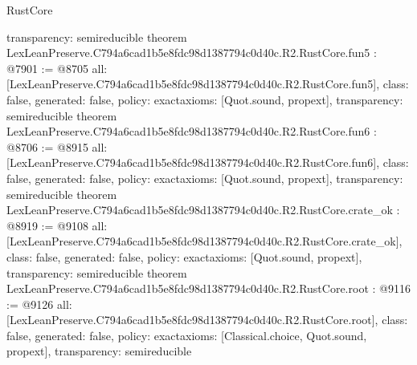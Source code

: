 \begin{lexlean}{RustCore}
\begin{coremodule}
{  transparency: semireducible
}
theorem LexLeanPreserve.C794a6cad1b5e8fdc98d1387794c0d40c.R2.RustCore.fun5 : @7901 := @8705 {
  all: [LexLeanPreserve.C794a6cad1b5e8fdc98d1387794c0d40c.R2.RustCore.fun5],
  class: false,
  generated: false,
  policy: exact{axioms: [Quot.sound, propext]},
  transparency: semireducible
}
theorem LexLeanPreserve.C794a6cad1b5e8fdc98d1387794c0d40c.R2.RustCore.fun6 : @8706 := @8915 {
  all: [LexLeanPreserve.C794a6cad1b5e8fdc98d1387794c0d40c.R2.RustCore.fun6],
  class: false,
  generated: false,
  policy: exact{axioms: [Quot.sound, propext]},
  transparency: semireducible
}
theorem LexLeanPreserve.C794a6cad1b5e8fdc98d1387794c0d40c.R2.RustCore.crate_ok : @8919 := @9108 {
  all: [LexLeanPreserve.C794a6cad1b5e8fdc98d1387794c0d40c.R2.RustCore.crate_ok],
  class: false,
  generated: false,
  policy: exact{axioms: [Quot.sound, propext]},
  transparency: semireducible
}
theorem LexLeanPreserve.C794a6cad1b5e8fdc98d1387794c0d40c.R2.RustCore.root : @9116 := @9126 {
  all: [LexLeanPreserve.C794a6cad1b5e8fdc98d1387794c0d40c.R2.RustCore.root],
  class: false,
  generated: false,
  policy: exact{axioms: [Classical.choice, Quot.sound, propext]},
  transparency: semireducible
}


\end{coremodule}
\end{lexlean}
